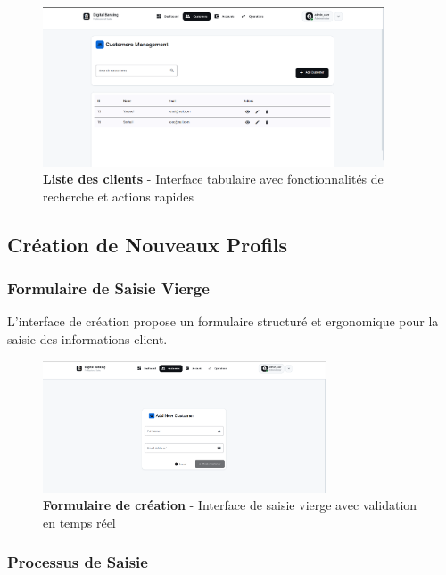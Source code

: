 \documentclass[11pt, a4paper]{article}
\begin{document}
\begin{figure}[H]
    \centering
    \includegraphics[width=0.9\textwidth]{screenshots/04_01_customer_list_initial.png}
    \caption{\textbf{Liste des clients} - Interface tabulaire avec fonctionnalités de recherche et actions rapides}
    \label{fig:customer_list_initial}
\end{figure}

\subsection{Création de Nouveaux Profils}

\subsubsection{Formulaire de Saisie Vierge}

L'interface de création propose un formulaire structuré et ergonomique pour la saisie des informations client.

\begin{figure}[H]
    \centering
    \includegraphics[width=0.75\textwidth]{screenshots/04_02_customer_form_new_empty.png}
    \caption{\textbf{Formulaire de création} - Interface de saisie vierge avec validation en temps réel}
    \label{fig:customer_form_new_empty}
\end{figure}

\subsubsection{Processus de Saisie}
\end{document}
